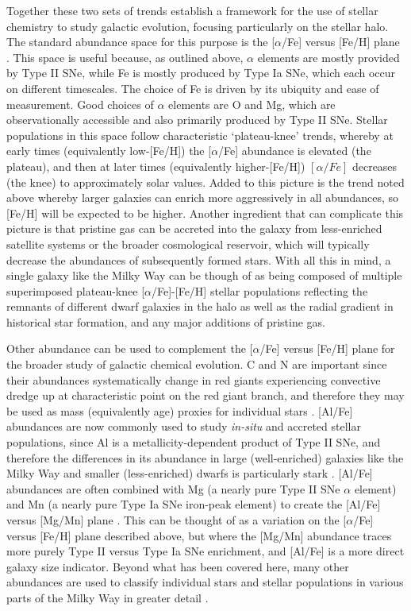 Together these two sets of trends establish a framework for the use of stellar chemistry to study galactic evolution, focusing particularly on the stellar halo. The standard abundance space for this purpose is the [$\alpha$/Fe] versus [Fe/H] plane \parencite[e.g.][]{hawkins15}. This space is useful because, as outlined above, $\alpha$ elements are mostly provided by Type II SNe, while Fe is mostly produced by Type Ia SNe, which each occur on different timescales. The choice of Fe is driven by its ubiquity and ease of measurement. Good choices of $\alpha$ elements are O and Mg, which are observationally accessible and also primarily produced by Type II SNe. Stellar populations in this space follow characteristic `plateau-knee' trends, whereby at early times (equivalently low-[Fe/H]) the [$\alpha$/Fe] abundance is elevated (the plateau), and then at later times (equivalently higher-[Fe/H]) $[\alpha/Fe]$ decreases (the knee) to approximately solar values. Added to this picture is the trend noted above whereby larger galaxies can enrich more aggressively in all abundances, so [Fe/H] will be expected to be higher. Another ingredient that can complicate this picture is that pristine gas can be accreted into the galaxy from less-enriched satellite systems or the broader cosmological reservoir, which will typically decrease the abundances of subsequently formed stars. With all this in mind, a single galaxy like the Milky Way can be though of as being composed of multiple superimposed plateau-knee [$\alpha$/Fe]-[Fe/H] stellar populations reflecting the remnants of different dwarf galaxies in the halo as well as the radial gradient in historical star formation, and any major additions of pristine gas. 

Other abundance can be used to complement the [$\alpha$/Fe] versus [Fe/H] plane for the broader study of galactic chemical evolution. C and N are important since their abundances systematically change in red giants experiencing convective dredge up at characteristic point on the red giant branch, and therefore they may be used as mass (equivalently age) proxies for individual stars \parencite[e.g.][]{martig16,mackereth19a}. [Al/Fe] abundances are now commonly used to study \textit{in-situ} and accreted stellar populations, since Al is a metallicity-dependent product of Type II SNe, and therefore the differences in its abundance in large (well-enriched) galaxies like the Milky Way and smaller (less-enriched) dwarfs is particularly stark \parencite[e.g.][]{hawkins15,das20,belokurov22}. [Al/Fe] abundances are often combined with Mg (a nearly pure Type II SNe $\alpha$ element) and Mn (a nearly pure Type Ia SNe iron-peak element) to create the [Al/Fe] versus [Mg/Mn] plane \parencite[e.g.][]{hawkins15,das20,horta21a,fernandez23}. This can be thought of as a variation on the [$\alpha$/Fe] versus [Fe/H] plane described above, but where the [Mg/Mn] abundance traces more purely Type II versus Type Ia SNe enrichment, and [Al/Fe] is a more direct galaxy size indicator. Beyond what has been covered here, many other abundances are used to classify individual stars and stellar populations in various parts of the Milky Way in greater detail \parencite[e.g. see][]{frebel15,barbuy18}. 

